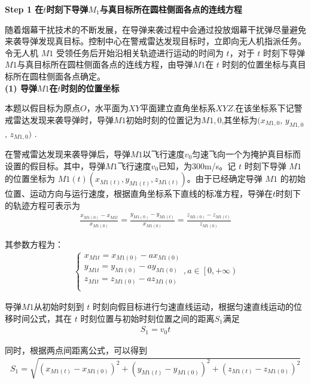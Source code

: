 \documentclass[../main.tex]{subfiles}
\begin{document}
\noindent \textbf{Step 1 在\( t \)时刻下导弹\( M_1 \)与真目标所在圆柱侧面各点的连线方程}
\par 随着烟幕干扰技术的不断发展，在导弹来袭过程中会通过投放烟幕干扰弹尽量避免来袭导弹发现真目标。控制中心在警戒雷达发现目标时，立即向无人机指派任务。令无人机 \( M1 \) 受领任务后开始沿相关轨迹进行运动的时间为 \( t \)，对于 \( t \) 时刻下导弹 \( M1 \)与真目标所在圆柱侧面各点的连线方程，由导弹$M1$在 \( t \) 时刻的位置坐标与真目标所在圆柱侧面各点确定。
\\
\textbf{(1) 导弹$M1$在\( t \)时刻的位置坐标}
\par 本题以假目标为原点$O$，水平面为$XY$平面建立直角坐标系$XYZ$.在该坐标系下记警戒雷达发现来袭导弹时，导弹$M1$初始时刻的位置记为$M{1,0}$,其坐标为$(x_{M{1,0}}$, $y_{M{1,0}}$, $z_{M{1,0}})$ .
\par 在警戒雷达发现来袭导弹后，导弹\( M1 \)以飞行速度\( v_0 \)匀速飞向一个为掩护真目标而设置的假目标。其中，导弹$M1$飞行速度\( v_0 \)已知，为$300$m/s。记 \( t \) 时刻下导弹 \( M1 \) 的位置坐标为 \( M1(t)(x_{M1(t)}, y_{M1(t)}, z_{M1(t)}) \)。由于已经确定导弹 \( M1 \) 的初始位置、运动方向与运行速度，根据直角坐标系下直线的标准方程，导弹在$t$时刻下的轨迹方程可表示为
\begin{align}\label{1.1}
\frac{x_{M1(0)}-x_{M1t}}{x_{M1(0)}}=\frac{y_{M1(0)}-y_{M1(t)}}{x_{M1(0)}}=\frac{z_{M1(0)}-z_{M1(t)}}{z_{M1(0)}}
\end{align}
\par 其参数方程为：
\begin{align}\label{1.2}
\left\{ \begin{array}{l}
x_{M1t}=x_{M1(0)}-ax_{M1(0)}\\
y_{M1t}=y_{M1(0)}-ay_{M1(0)}\\
z_{M1t}=z_{M1(0)}-az_{M1(0)}\\
\end{array} \right. ,a\in \left[ 0,+\infty \right)
\end{align}
\par 导弹$M1$从初始时刻到 \( t \) 时刻向假目标进行匀速直线运动，根据匀速直线运动的位移时间公式，其在 $t$ 时刻位置与初始时刻位置之间的距离$S_1$满足
\begin{align}\label{1.5}
S_1 = v_0 t
\end{align}
\par 同时，根据两点间距离公式，可以得到
\begin{align}\label{1.3}
S_1 =  \sqrt{(x_{M1(t)} - x_{M1(0)})^2 + (y_{M1(t)} - y_{M1(0)})^2 + (z_{M1(t)} - z_{M1(0)})^2}
\end{align}
\end{document}
